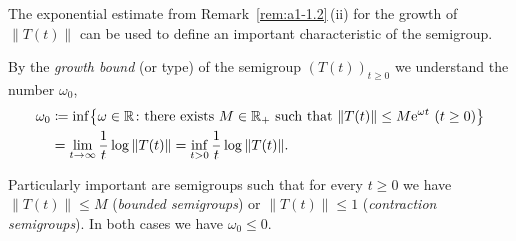 The exponential estimate from Remark~\ref{rem:a1-1.2}\,(ii) for the growth of\/ $ \lVert T(t) \rVert $ can be used to define an important characteristic of the semigroup.
\begin{definition}\label{def:a1-1.3}
By the \emph{growth bound} (or type) of the semigroup $ (T(t))_{t\geq0} $ we understand the number $ \omega_{0} $,
\begin{equation}\label{eq:a1-1.1}
\begin{aligned}
    \omega_{0} & \coloneq \inf \bigl\{ \omega \in \R \colon \text{there exists } %
         M \in \R_{+} \text{ such that }
        \|T(t)\| \leq M \eu^{\omega t} \ (t \geq 0) \bigr\} \\
    & = \lim_{t\to\infty} \frac{1}{t}\log\|T(t)\|
      = \inf_{t>0} \frac{1}{t}\log\|T(t)\| .
\end{aligned}
\end{equation}
\end{definition}
Particularly important are semigroups such that for every $t \geq 0$ we have $\|T(t)\| \leq M$ (\emph{bounded semigroups}) or $\|T(t)\| \leq 1$ (\emph{contraction semigroups}).
In both cases we have $\omega_{0} \leq 0$.

